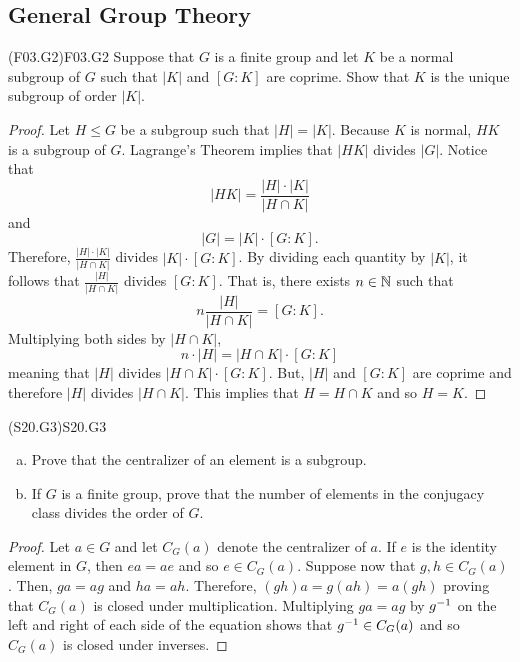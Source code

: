 \documentclass[../AlgebraQualSolutions.tex]{subfiles}
\begin{document}
\subsection{General Group Theory}

\begin{prob}{(F03.G2)}{F03.G2}
	Suppose that $G$ is a finite group and let $K$ be a normal subgroup of $G$ such that $|K|$ and $[G:K]$ are coprime. Show that $K$ is the unique subgroup of order $|K|$.
\end{prob}

\begin{proof}
	Let $H \leq G$ be a subgroup such that $|H| = |K|$. Because $K$ is normal,  $HK$ is a subgroup of $G$. Lagrange's Theorem implies that $|HK|$ divides $|G|$. Notice that
		\[|HK| = \frac{|H| \cdot |K|}{|H \cap K|}\]
	and
		\[|G| = |K| \cdot [G:K].\]
	Therefore, $\frac{|H| \cdot |K|}{|H \cap K|}$ divides $|K| \cdot [G:K]$. By dividing each quantity by $|K|$, it follows that $\frac{|H|}{|H\cap K|}$ divides $[G:K]$. That is, there exists $n \in \mathbb{N}$ such that
		\[n \frac{|H|}{|H \cap K|} = [G:K].\]
	Multiplying both sides by $|H \cap K|$,
		\[n \cdot |H| = |H\cap K| \cdot [G:K]\]
	meaning that $|H|$ divides $|H\cap K| \cdot [G:K]$. But, $|H|$ and $[G:K]$ are coprime and therefore $|H|$ divides $|H \cap K|$. This implies that $H = H \cap K$ and so $H = K$.
\end{proof}

\begin{prob}{(S20.G3)}{S20.G3}
	\begin{enumerate}[(a)]
	\item Prove that the centralizer of an element is a subgroup.
	\item If $G$ is a finite group, prove that the number of elements in the conjugacy class divides the order of $G$.
	\end{enumerate}
	\end{prob}
	
	\begin{proof}
		Let $a \in G$ and let $C_G(a)$ denote the centralizer of $a$. If $e$ is the identity element in $G$, then $ea = ae$ and so $e \in C_G(a)$. Suppose now that $g,h \in C_G(a)$. Then, $ga = ag$ and $ha = ah$. Therefore, $(gh)a = g(ah) = a(gh)$ proving that $C_G(a)$ is closed under multiplication. Multiplying $ga = ag$ by $g^{-1}$ on the left and right of each side of the equation shows that $g^{-1} \in C_G(a)$ and so $C_G(a)$ is closed under inverses.
	\end{proof}
	
\end{document}
